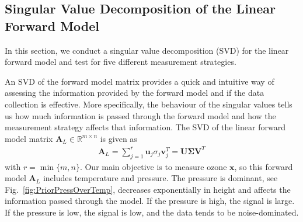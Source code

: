 

\subsection{Singular Value Decomposition of the Linear Forward Model}
\label{sec:SVD}
In this section, we conduct a singular value decomposition (SVD) for the linear forward model and test for five different measurement strategies.

An SVD of the forward model matrix provides a quick and intuitive way of assessing the information provided by the forward model and if the data collection is effective.
More specifically, the behaviour of the singular values tells us how much information is passed through the forward model and how the measurement strategy affects that information.
The SVD of the linear forward model matrix $\bm{A}_L \in \mathbb{R}^{m \times n}$ is given as
\begin{align}
	\bm{A}_L = \sum_{j =1}^{r} \bm{u}_j  \sigma_j \bm{v}^T_j = \bm{U} \bm{\Sigma} \bm{V}^T
\end{align}
with $r = \min\{m,n\}$.
Our main objective is to measure ozone $\bm{x}$, so this forward model $\bm{A}_L$ includes temperature and pressure.
The pressure is dominant, see Fig.~\ref{fig:PriorPressOverTemp}, decreases exponentially in height and affects the information passed through the model.
If the pressure is high, the signal is large.
If the pressure is low, the signal is low, and the data tends to be noise-dominated.

